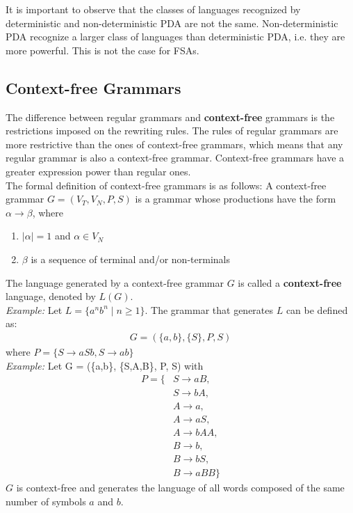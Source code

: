 It is important to observe that the classes of languages recognized by deterministic and non-deterministic
PDA are not the same.
Non-deterministic PDA recognize a larger class of languages than deterministic PDA, i.e. they are more powerful.
This is not the case for FSAs.
\subsection{Context-free Grammars}
The difference between regular grammars 
and \textbf{context-free} grammars is the restrictions imposed on the rewriting rules.
The rules of regular grammars are more restrictive than the ones of context-free grammars, 
which means that any regular grammar is also a context-free grammar. Context-free grammars
have a greater expression power than regular ones.\\

The formal definition of context-free grammars is as follows:
A context-free grammar $G = (V_T, V_N, P, S)$ is a grammar 
whose productions have the form $\alpha \rightarrow \beta$, where 
\begin{enumerate}
  \item $\lvert \alpha \rvert = 1$ and $\alpha \in V_N$
  \item $\beta$ is a sequence of terminal and/or non-terminals
\end{enumerate}
The language generated by a context-free grammar $G$ is called a \textbf{context-free} language,
denoted by $L(G)$.\\

\textit{Example:} Let $L = \{a^n b^n \mid n \geq 1\}$. The grammar that generates $L$ can be defined as:
\begin{align*}
  G = (\{a,b\}, \{S\}, P, S)
\end{align*}
where $P= \{S \rightarrow aSb, S \rightarrow ab\}$\\

\textit{Example:} Let G = (\{a,b\}, \{S,A,B\}, P, S)
with 
\begin{align*}
  P = \{ & S \rightarrow aB,\\
    & S \rightarrow bA,\\
    & A \rightarrow a,\\
    & A \rightarrow aS,\\
    & A \rightarrow bAA,\\
    & B \rightarrow b,\\
    & B \rightarrow bS,\\
    & B \rightarrow aBB
    \}
\end{align*}
$G$ is context-free and generates the language of all words composed of the same number of symbols $a$ and $b$.

